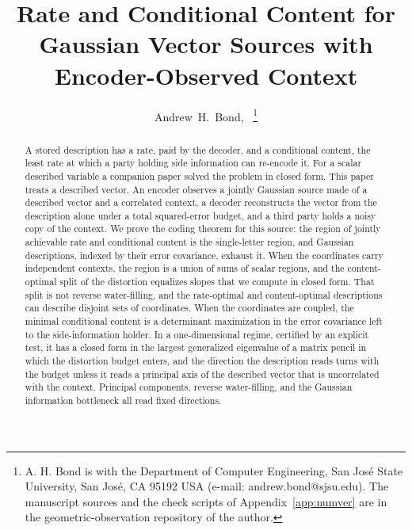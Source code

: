 \documentclass[11pt,onecolumn]{IEEEtran}
\begin{document}
\title{Rate and Conditional Content for\\ Gaussian Vector Sources with Encoder-Observed Context}

\author{Andrew~H.~Bond,~%
\thanks{A. H. Bond is with the Department of Computer Engineering, San Jos\'e
State University, San Jos\'e, CA 95192 USA (e-mail: andrew.bond@sjsu.edu).
The manuscript sources and the check scripts of Appendix~\ref{app:numver}
are in the geometric-observation repository of the author.}}


\maketitle

\begin{abstract}
A stored description has a rate, paid by the decoder, and a conditional
content, the least rate at which a party holding side information can
re-encode it. For a scalar described variable a companion paper solved
the problem in closed form. This paper treats a described vector. An
encoder observes a jointly Gaussian source made of a described vector and
a correlated context, a decoder reconstructs the vector from the
description alone under a total squared-error budget, and a third party
holds a noisy copy of the context. We prove the coding theorem for this
source: the region of jointly achievable rate and conditional content is
the single-letter region, and Gaussian descriptions, indexed by their
error covariance, exhaust it. When the coordinates carry independent
contexts, the region is a union of sums of scalar regions, and the
content-optimal split of the distortion equalizes slopes that we compute
in closed form. That split is not reverse water-filling, and the
rate-optimal and content-optimal descriptions can describe disjoint sets
of coordinates. When the coordinates are coupled, the minimal conditional
content is a determinant maximization in the error covariance left to the
side-information holder. In a one-dimensional regime, certified by an
explicit test, it has a closed form in the largest generalized eigenvalue
of a matrix pencil in which the distortion budget enters, and the direction
the description reads turns with the budget unless it reads a principal
axis of the described vector that is uncorrelated with the context. Principal
components, reverse water-filling, and the Gaussian information
bottleneck all read fixed directions.
\end{abstract}
\end{document}
